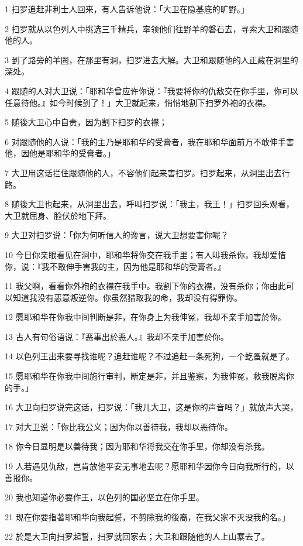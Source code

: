 \par 1 扫罗追赶非利士人回来，有人告诉他说：「大卫在隐基底的旷野。」
\par 2 扫罗就从以色列人中挑选三千精兵，率领他们往野羊的磐石去，寻索大卫和跟随他的人。
\par 3 到了路旁的羊圈，在那里有洞，扫罗进去大解。大卫和跟随他的人正藏在洞里的深处。
\par 4 跟随的人对大卫说：「耶和华曾应许你说：『我要将你的仇敌交在你手里，你可以任意待他。』如今时候到了！」大卫就起来，悄悄地割下扫罗外袍的衣襟。
\par 5 随後大卫心中自责，因为割下扫罗的衣襟；
\par 6 对跟随他的人说：「我的主乃是耶和华的受膏者，我在耶和华面前万不敢伸手害他，因他是耶和华的受膏者。」
\par 7 大卫用这话拦住跟随他的人，不容他们起来害扫罗。扫罗起来，从洞里出去行路。
\par 8 随後大卫也起来，从洞里出去，呼叫扫罗说：「我主，我王！」扫罗回头观看，大卫就屈身、脸伏於地下拜。
\par 9 大卫对扫罗说：「你为何听信人的谗言，说大卫想要害你呢？
\par 10 今日你亲眼看见在洞中，耶和华将你交在我手里；有人叫我杀你，我却爱惜你，说：『我不敢伸手害我的主，因为他是耶和华的受膏者。』
\par 11 我父啊，看看你外袍的衣襟在我手中。我割下你的衣襟，没有杀你；你由此可以知道我没有恶意叛逆你。你虽然猎取我的命，我却没有得罪你。
\par 12 愿耶和华在你我中间判断是非，在你身上为我伸冤，我却不亲手加害於你。
\par 13 古人有句俗语说：『恶事出於恶人。』我却不亲手加害於你。
\par 14 以色列王出来要寻找谁呢？追赶谁呢？不过追赶一条死狗，一个虼蚤就是了。
\par 15 愿耶和华在你我中间施行审判，断定是非，并且鉴察，为我伸冤，救我脱离你的手。」
\par 16 大卫向扫罗说完这话，扫罗说：「我儿大卫，这是你的声音吗？」就放声大哭，
\par 17 对大卫说：「你比我公义；因为你以善待我，我却以恶待你。
\par 18 你今日显明是以善待我；因为耶和华将我交在你手里，你却没有杀我。
\par 19 人若遇见仇敌，岂肯放他平安无事地去呢？愿耶和华因你今日向我所行的，以善报你。
\par 20 我也知道你必要作王，以色列的国必坚立在你手里。
\par 21 现在你要指著耶和华向我起誓，不剪除我的後裔，在我父家不灭没我的名。」
\par 22 於是大卫向扫罗起誓，扫罗就回家去；大卫和跟随他的人上山寨去了。

